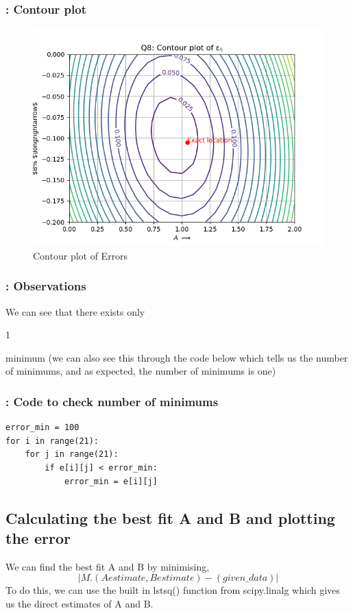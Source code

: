 \documentclass[11pt]{article}
\begin{document}
\subsubsection{: Contour plot}
\begin{figure}[H]
    \centering
    \includegraphics[scale = 0.75]{Figure_3.png}
    \caption{Contour plot of Errors}
\end{figure}

\subsubsection{: Observations}
We can see that there exists only \begin{textbf}1\end{textbf} minimum (we can also see this through the code below which tells us the number of minimums, and as expected, the number of minimums is one) 
\subsubsection{: Code to check number of minimums}
\begin{verbatim}
error_min = 100
for i in range(21):
	for j in range(21):
		if e[i][j] < error_min:
			error_min = e[i][j]
\end{verbatim}

\subsection{Calculating the best fit A and B and plotting the error}
We can find the best fit A and B by minimising,
\begin{equation}
|M.(Aestimate,Bestimate) - (given\_data)|
\end{equation}
To do this, we can use the built in lstsq() function from scipy.linalg which gives us the direct estimates of A and B.
\end{document}

